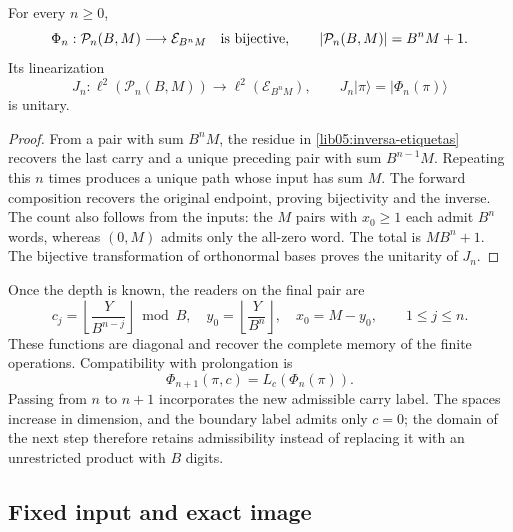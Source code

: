 \begin{theorem}
\label{lib05:teo-rutas}
For every \(n\geq0\),
\begin{equation}
 \Phi_n:\mathcal P_n(B,M)\longrightarrow\mathcal E_{B^nM}
 \quad\hbox{is bijective},\qquad
 |\mathcal P_n(B,M)|=B^nM+1.
 \label{lib05:biyeccion-rutas}
\end{equation}
Its linearization
\begin{equation}
 J_n:\ell^2(\mathcal P_n(B,M))\longrightarrow
          \ell^2(\mathcal E_{B^nM}),\qquad
 J_n|\pi\rangle=|\Phi_n(\pi)\rangle
 \label{lib05:jn}
\end{equation}
is unitary.
\end{theorem}

\begin{proof}
From a pair with sum \(B^nM\), the residue in
\eqref{lib05:inversa-etiquetas} recovers the last carry and a
unique preceding pair with sum \(B^{n-1}M\). Repeating this \(n\) times
produces a unique path whose input has sum \(M\). The forward
composition recovers the original endpoint, proving bijectivity and
the inverse. The count also follows from the inputs: the
\(M\) pairs with \(x_0\geq1\) each admit \(B^n\) words,
whereas \((0,M)\) admits only the all-zero
word. The total is \(MB^n+1\). The bijective transformation of
orthonormal bases proves the unitarity of \(J_n\).
\end{proof}

Once the depth is known, the readers on the final pair are
\begin{equation}
 c_j=\left\lfloor\frac{Y}{B^{n-j}}\right\rfloor\bmod B,
 \quad y_0=\left\lfloor\frac{Y}{B^n}\right\rfloor,
 \quad x_0=M-y_0,
 \qquad 1\leq j\leq n.
 \label{lib05:lectores-ruta}
\end{equation}
These functions are diagonal and recover the complete memory of
the finite operations. Compatibility with prolongation is
\begin{equation}
 \Phi_{n+1}(\pi,c)=L_c(\Phi_n(\pi)).
 \label{lib05:compatibilidad-prolongacion}
\end{equation}
Passing from \(n\) to \(n+1\) incorporates the new admissible
carry label. The spaces increase in dimension, and the
boundary label admits only \(c=0\); the domain of the
next step therefore retains admissibility instead of replacing it
with an unrestricted product with \(B\) digits.

\subsection{Fixed input and exact image}
\label{lib05:entrada-fija}

